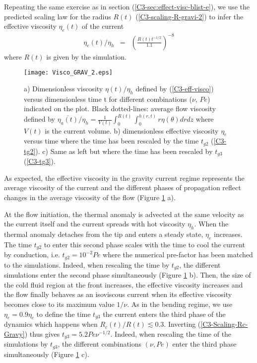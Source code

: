 Repeating      the      same      exercise     as      in      section
(\ref{C3-sec:effect-visc-blist-e}), we  use the predicted  scaling law
for  the  radius  $R(t)$  (\ref{C3-scaling-R-gravi-2})  to  infer  the
effective viscosity $\eta_e(t)$ of the current
\begin{eqnarray}
  \eta_e(t)/\eta_h&=& \left(\frac{R(t)t^{-1/2}}{1.1}\right)^{-8}\label{C3-eff-visco-grav}
\end{eqnarray}
where $R(t)$ is given by the simulation.
\begin{figure}
  \begin{center}
    \graphicspath{ {/Users/thorey/Documents/These/Projet/Refroidissement/Skin_Model/Figure/JFM_V13/} }
    \texttt{[image: Visco\_GRAV\_2.eps]}
    \caption{a)  Dimensionless viscosity  $\eta(t)/\eta_h$ defined  by
      (\ref{C3-eff-visco}) versus  dimensionless time t  for different
      combinations  ($\nu$,  $Pe$)  indicated   on  the  plot.   Black
      dotted-lines:    average     flow    viscosity     defined    by
      $\overline{\eta_a(t)}/\eta_h                                   =
      \frac{1}{V(t)}\int_0^{R(t)}\int_0^{h(r,t)} r \eta(\theta) dr dz$
      where $V(t)$ is the  current volume.  b) dimensionless effective
      viscosity $\eta_e$ versus time where  the time has been rescaled
      by the time $t_{g2}$ (\ref{C3-tg2}).   c) Same as left but where
      the time has been rescaled by $t_{g3}$ (\ref{C3-tg3}). }
    \label{C3-Visco_GRAV_2}
  \end{center}
\end{figure}

As expected,  the effective  viscosity in  the gravity  current regime
represents  the average  viscosity of  the current  and the  different
phases of propagation reflect changes  in the average viscosity of the
flow (Figure \ref{C3-Visco_GRAV_2} a).

At the  flow initiation, the thermal  anomaly is advected at  the same
velocity  as the  current  itself  and the  current  spreads with  hot
viscosity $\eta_h$. When the thermal anomaly detaches from the tip and
enters a steady state, $\eta_e$ increases.  The time $t_{g2}$ to enter
this  second  phase scales  with  the  time  to  cool the  current  by
conduction,  i.e.  $t_{g2}=10^{-2}Pe$  where the  numerical pre-factor
has been matched to the  simulations.  Indeed, when rescaling the time
by  $t_{g2}$,  the  different   simulations  enter  the  second  phase
simultaneously (Figure  \ref{C3-Visco_GRAV_2} b).   Then, the  size of
the cold fluid region at  the front increases, the effective viscosity
increases and the  flow finally behaves as an  isoviscous current when
its effective  viscosity becomes close  to its maximum  value $1/\nu$.
As in  the bending regime, we  use $\eta_e = 0.9\eta_c$  to define the
time $t_{g3}$ the current enters the third phase of the dynamics which
happens        when        $R_c(t)/R(t)\lesssim0.3$.         Inverting
(\ref{C3-Scaling-Rc-Gravy})                 thus                 gives
$t_{g3}=5.2Pe\nu^{-1/2}$.  Indeed,  when  rescaling the  time  of  the
simulations by  $t_{g3}$, the different combinations  $(\nu,Pe)$ enter
the third phase simultaneously (Figure \ref{C3-Visco_GRAV_2} c).

